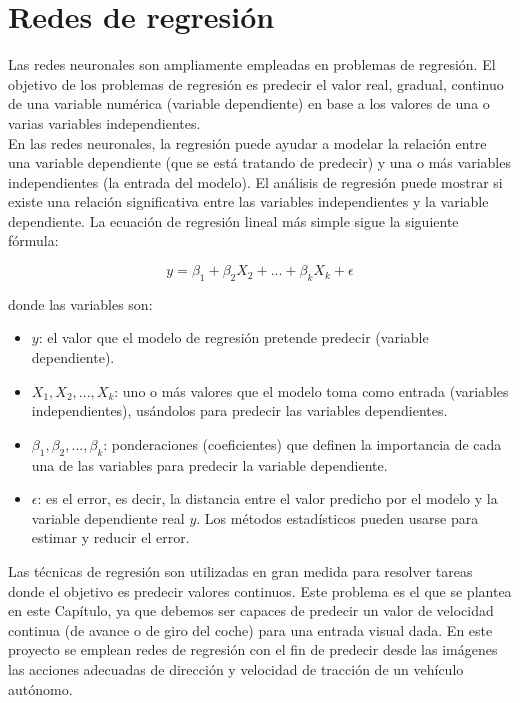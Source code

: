 \chapter{Redes de regresión}\label{cap.regresion}

Las redes neuronales son ampliamente empleadas en problemas de regresión. El objetivo de los problemas de regresión es predecir el valor real, gradual, continuo de una variable numérica (variable dependiente) en base a los valores de una o varias variables independientes.\\

En las redes neuronales, la regresión puede ayudar a modelar la relación entre una variable dependiente (que se está tratando de predecir) y una o más variables independientes (la entrada del modelo). El análisis de regresión puede mostrar si existe una relación significativa entre las variables independientes y la variable dependiente. La ecuación de regresión lineal más simple sigue la siguiente fórmula:

\[ y = \beta_{1} + \beta_{2} X_{2} + ... + \beta_{k} X_{k} + \epsilon  \]

donde las variables son:

\begin{itemize}
    \item \(y\): el valor que el modelo de regresión pretende predecir (variable dependiente).
    \item \(X_{1}, X_{2},... , X_{k}\): uno o más valores que el modelo toma como entrada (variables independientes), usándolos para predecir las variables dependientes.
    \item \(\beta_{1}, \beta_{2},... , \beta_{k}\): ponderaciones (coeficientes) que definen la importancia de cada una de las variables para predecir la variable dependiente.
    \item \(\epsilon\): es el error, es decir, la distancia entre el valor predicho por el modelo y la variable dependiente real \(y\). Los métodos estadísticos pueden usarse para estimar y reducir el  error.
\end{itemize}

Las técnicas de regresión son utilizadas en gran medida para resolver tareas donde el objetivo es predecir valores continuos. Este problema es el que se plantea en este Capítulo, ya que debemos ser capaces de predecir un valor de velocidad continua (de avance o de giro del coche) para una entrada visual dada. En este proyecto se emplean redes de regresión con el fin de predecir desde las imágenes las acciones adecuadas de dirección y velocidad de tracción de un vehículo autónomo.\\


